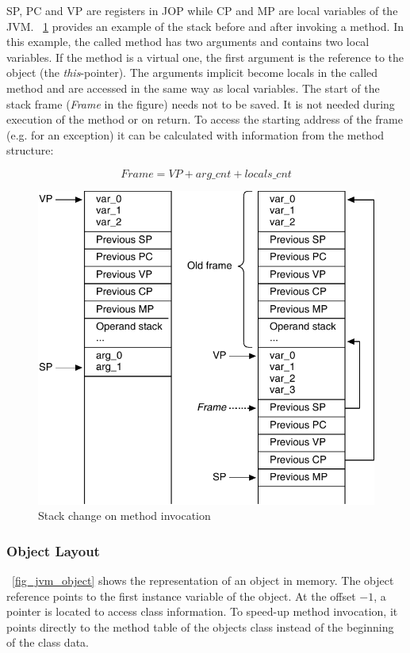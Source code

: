 SP, PC and VP are registers in JOP while CP and MP are local
variables of the JVM. \figurename~\ref{fig_jvm_stack_invoke}
provides an example of the stack before and after invoking a method.
In this example, the called method has two arguments and contains
two local variables. If the method is a virtual one, the first
argument is the reference to the object (the \emph{this}-pointer).
The arguments implicit become locals in the called method and are
accessed in the same way as local variables. The start of the stack
frame (\emph{Frame} in the figure) needs not to be saved. It is not
needed during execution of the method or on return. To access the
starting address of the frame (e.g. for an exception) it can be
calculated with information from the method structure:

\[Frame = VP + arg\_cnt + locals\_cnt\]

\begin{figure}
    \centering
    \includegraphics[scale=\picscale]{jvm/jvm_stack_invocation}
    \caption{Stack change on method invocation}
    \label{fig_jvm_stack_invoke}
\end{figure}

\subsubsection{Object Layout}

\figurename~\ref{fig_jvm_object} shows the representation of an
object in memory. The object reference points to the first instance
variable of the object. At the offset $-1$, a pointer is located to
access class information. To speed-up method invocation, it points
directly to the method table of the objects class instead of the
beginning of the class data.

